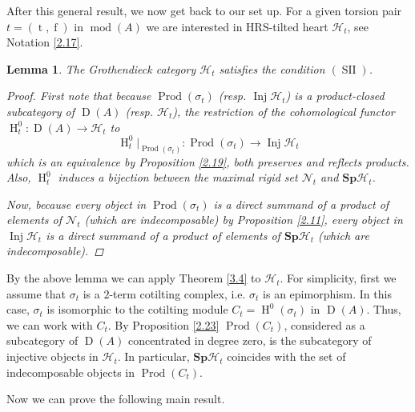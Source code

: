 \documentclass[12pt]{amsart}
\numberwithin{equation}{section}
\newtheorem{lemma}{Lemma}[section]
\theoremstyle{definition}
\DeclareMathOperator{\modd}{mod}
\DeclareMathOperator{\Inj}{Inj}
\DeclareMathOperator{\SII}{SII}
\DeclareMathOperator{\D}{D}
\DeclareMathOperator{\ts}{t}
\DeclareMathOperator{\fs}{f}
\DeclareMathOperator{\HH}{H}
\DeclareMathOperator{\Prod}{Prod}
\newtheorem*{theorem 0*}{Theorem}
\newtheorem*{theorem a*}{Theorem A}
\newtheorem*{theorem b*}{Theorem B}
\numberwithin{diagram}{section}
\begin{document}
After this general result, we now get back to our set up. For a given torsion pair $t=(\ts,\fs)$ in $\modd(A)$ we are interested in HRS-tilted heart $\mathcal{H}_t$, see Notation \ref{2.17}.
\begin{lemma}\label{3.5}
The Grothendieck category $\mathcal{H}_t$ satisfies the condition $(\SII)$.
\begin{proof}
First note that because $\Prod(\sigma_t)$ (resp. $\Inj\mathcal{H}_t$) is a product-closed subcategory of $\D(A)$ (resp. $\mathcal{H}_t$), the restriction of the cohomological functor $\HH^0_t:\D(A)\rightarrow \mathcal{H}_t$ to
\[\HH^0_t|_{\Prod(\sigma_t)}:\Prod(\sigma_t)\rightarrow \Inj\mathcal{H}_t\]
which is an equivalence by Proposition \ref{2.19},
both preserves and reflects products. Also, $\HH^0_t$ induces a bijection between the maximal rigid set $\mathcal{N}_t$ and $\textbf{Sp}\mathcal{H}_t$.
	 
Now, because every object in $\Prod(\sigma_t)$ is a direct summand of a product of elements of $\mathcal{N}_t$ (which are indecomposable) by Proposition \ref{2.11}, every object in $\Inj\mathcal{H}_t$ is a direct summand of a product of elements of $\textbf{Sp}\mathcal{H}_t$ (which are indecomposable).
	\end{proof}
	\end{lemma}
By the above lemma we can apply Theorem \ref{3.4} to $\mathcal{H}_t$.
For simplicity, first we assume that $\sigma_t$ is a $2$-term cotilting complex, i.e. $\sigma_t$ is an epimorphism. In this case, $\sigma_t$ is isomorphic to the cotilting module $C_t=\HH^0(\sigma_t)$ in $\D(A)$. Thus, we can work with $C_t$.
By Proposition \ref{2.23} $\Prod(C_t)$, considered as a subcategory of $\D(A)$ concentrated in degree zero, is the subcategory of injective objects in $\mathcal{H}_t$. In particular, $\textbf{Sp}\mathcal{H}_t$ coincides with the set of indecomposable objects in $\Prod(C_t)$.
	
Now we can prove the following main result.
\end{document}
